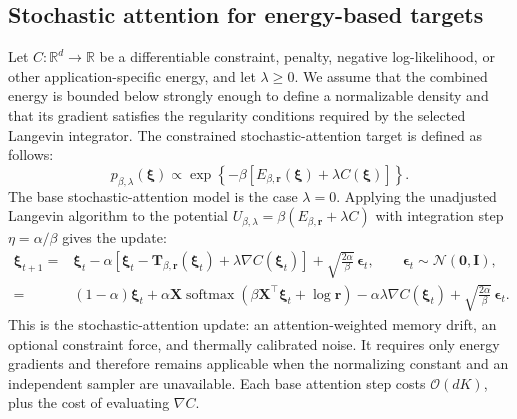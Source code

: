 
\subsection{Stochastic attention for energy-based targets}

Let $C:\mathbb R^d\rightarrow\mathbb R$ be a differentiable constraint,
penalty, negative log-likelihood, or other application-specific energy, and let
$\lambda\geq0$. We assume that the combined energy is bounded below strongly
enough to define a normalizable density and that its gradient satisfies the
regularity conditions required by the selected Langevin integrator. The
constrained stochastic-attention target is defined as follows:
\begin{equation}
p_{\beta,\lambda}(\boldsymbol\xi)
\propto \exp\!\left\{-\beta\left[
E_{\beta,\mathbf r}(\boldsymbol\xi)+\lambda C(\boldsymbol\xi)
\right]\right\}.
\label{eq:constrained-target}
\end{equation}
The base stochastic-attention model is the case $\lambda=0$. Applying the
unadjusted Langevin algorithm
to the potential $U_{\beta,\lambda}=\beta(E_{\beta,\mathbf r}+\lambda C)$
with integration step $\eta=\alpha/\beta$ gives the update:
\begin{align}
\boldsymbol\xi_{t+1}
={}&\boldsymbol\xi_t-\alpha\left[
\boldsymbol\xi_t-\mathbf T_{\beta,\mathbf r}(\boldsymbol\xi_t)
+\lambda\nabla C(\boldsymbol\xi_t)\right]
+\sqrt{\frac{2\alpha}{\beta}}\,\boldsymbol\epsilon_t,
\qquad \boldsymbol\epsilon_t\sim\mathcal N(\mathbf0,\mathbf I),
\label{eq:stochastic-attention}\\
={}&(1-\alpha)\boldsymbol\xi_t
+\alpha\mathbf X\operatorname{softmax}\!\left(
\beta\mathbf X^\top\boldsymbol\xi_t+\log\mathbf r\right)
-\alpha\lambda\nabla C(\boldsymbol\xi_t)
+\sqrt{\frac{2\alpha}{\beta}}\,\boldsymbol\epsilon_t.
\label{eq:stochastic-attention-expanded}
\end{align}
This is the stochastic-attention update: an attention-weighted memory drift,
an optional constraint force, and thermally calibrated noise. It requires only
energy gradients and therefore remains applicable when the normalizing
constant and an independent sampler are unavailable. Each base attention step
costs $\mathcal O(dK)$, plus the cost of evaluating $\nabla C$.

